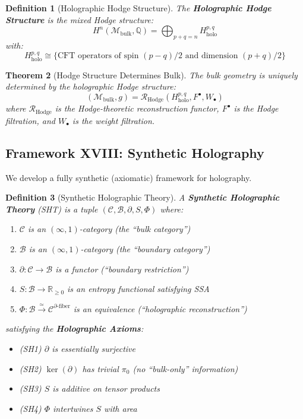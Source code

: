 \documentclass[12pt,a4paper]{article}
\newtheorem{theorem}{Theorem}[section]
\newtheorem{definition}[theorem]{Definition}
\begin{document}
\begin{definition}[Holographic Hodge Structure]\label{def:holo-hodge}
The \textbf{Holographic Hodge Structure} is the mixed Hodge structure:
\begin{equation}
H^n(\mathcal{M}_{\text{bulk}}, \mathbb{Q}) = \bigoplus_{p+q=n} H^{p,q}_{\text{holo}}
\end{equation}
with:
\begin{equation}
H^{p,q}_{\text{holo}} \cong \{ \text{CFT operators of spin } (p-q)/2 \text{ and dimension } (p+q)/2 \}
\end{equation}
\end{definition}

\begin{theorem}[Hodge Structure Determines Bulk]\label{thm:hodge-bulk}
The bulk geometry is uniquely determined by the holographic Hodge structure:
\begin{equation}
(\mathcal{M}_{\text{bulk}}, g) = \mathcal{R}_{\text{Hodge}}(H^{p,q}_{\text{holo}}, F^\bullet, W_\bullet)
\end{equation}
where $\mathcal{R}_{\text{Hodge}}$ is the Hodge-theoretic reconstruction functor, $F^\bullet$ is the Hodge filtration, and $W_\bullet$ is the weight filtration.
\end{theorem}

\subsection{Framework XVIII: Synthetic Holography}

We develop a fully synthetic (axiomatic) framework for holography.

\begin{definition}[Synthetic Holographic Theory]\label{def:synthetic-holo}
A \textbf{Synthetic Holographic Theory} (SHT) is a tuple $(\mathcal{C}, \mathcal{B}, \partial, S, \Phi)$ where:
\begin{enumerate}
    \item $\mathcal{C}$ is an $(\infty, 1)$-category (the ``bulk category'')
    \item $\mathcal{B}$ is an $(\infty, 1)$-category (the ``boundary category'')
    \item $\partial: \mathcal{C} \to \mathcal{B}$ is a functor (``boundary restriction'')
    \item $S: \mathcal{B} \to \mathbb{R}_{\geq 0}$ is an entropy functional satisfying SSA
    \item $\Phi: \mathcal{B} \xrightarrow{\simeq} \mathcal{C}^{\partial\text{-fiber}}$ is an equivalence (``holographic reconstruction'')
\end{enumerate}
satisfying the \textbf{Holographic Axioms}:
\begin{itemize}
    \item (SH1) $\partial$ is essentially surjective
    \item (SH2) $\ker(\partial)$ has trivial $\pi_0$ (no ``bulk-only'' information)
    \item (SH3) $S$ is additive on tensor products
    \item (SH4) $\Phi$ intertwines $S$ with area
\end{itemize}
\end{definition}
\end{document}
